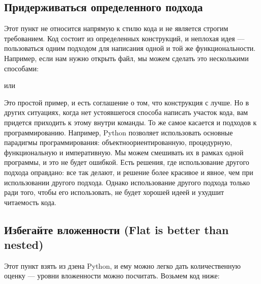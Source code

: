 \documentclass[letterpaper,10pt,russian]{sphinxmanual}
\begin{document}
\subsection{Придерживаться определенного подхода}
\label{\detokenize{educational_materials/styles/content:id6}}
\sphinxAtStartPar
Этот пункт не относится напрямую к стилю кода и не является строгим требованием. Код состоит из определенных конструкций, и неплохая идея — пользоваться одним подходом для написания одной и той же функциональности. Например, если нам нужно открыть файл, мы можем сделать это несколькими способами:

\begin{sphinxVerbatim}[commandchars=\\\{\}]
   
\end{sphinxVerbatim}

\sphinxAtStartPar
или

\begin{sphinxVerbatim}[commandchars=\\\{\}]
  
\end{sphinxVerbatim}

\sphinxAtStartPar
Это простой пример, и есть соглашение о том, что конструкция с  лучше. Но в других ситуациях, когда нет устоявшегося способа написать участок кода, вам придется приходить к этому внутри команды. То же самое касается и подходов к программированию. Например, Python позволяет использовать основные парадигмы программирования: объектно\sphinxhyphen{}ориентированную, процедурную, функциональную и императивную. Мы можем смешивать их в рамках одной программы, и это не будет ошибкой. Есть решения, где использование другого подхода оправдано: все так делают, и решение более красивое и явное, чем при использовании другого подхода. Однако использование другого подхода только ради того, чтобы его использовать, не будет хорошей идеей и ухудшит читаемость кода.


\subsection{Избегайте вложенности (Flat is better than nested)}
\label{\detokenize{educational_materials/styles/content:flat-is-better-than-nested}}
\sphinxAtStartPar
Этот пункт взять из дзена Python, и ему можно легко дать количественную оценку — уровни вложенности можно посчитать. Возьмем код ниже:
\end{document}
